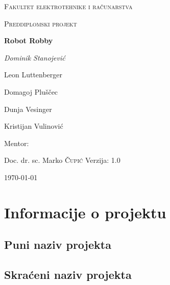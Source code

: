 \documentclass[times, utf8, numeric]{fer}
\begin{document}
\begin{titlepage}
	\centering
	{\scshape\LARGE Fakultet elektrotehnike i računarstva \par}
	\vspace{1cm}
	{\scshape\Large Preddiplomski projekt\par}
	\vspace{1.5cm}
	{\huge\bfseries Robot Robby\par}
	\vspace{2cm}
	{\Large\itshape
	Dominik Stanojević \par
	Leon Luttenberger \par
	Domagoj Pluščec \par
	Dunja Vesinger \par
	Kristijan Vulinović\par}
	\vfill
	Mentor:\par
	Doc. dr. sc. Marko \textsc{Čupić}
	\vfill	
	Verzija: 1.0
	\vfill

	{\large \today\par}
\end{titlepage}

\pagebreak
\tableofcontents

\pagebreak
{}

\chapter{Informacije o projektu}
\section{Puni naziv projekta}

\section{Skraćeni naziv projekta}
\end{document}
